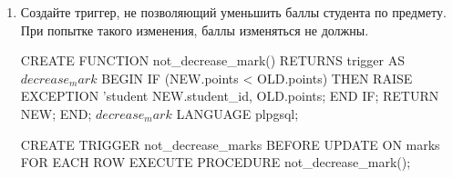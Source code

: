 \documentclass[10pt, a4paper]{article}
\begin{document}
\begin{enumerate}
	\item {Создайте триггер, не позволяющий уменьшить баллы студента по предмету. При попытке такого изменения, баллы изменяться не должны.

	\begin{sql}
CREATE FUNCTION not_decrease_mark() RETURNS trigger AS $decrease_mark$ 
BEGIN 
	IF (NEW.points < OLD.points) THEN	
		RAISE EXCEPTION 'student %
		NEW.student_id, OLD.points;
	END IF;
	RETURN NEW;
END; 
$decrease_mark$ LANGUAGE plpgsql;

CREATE TRIGGER not_decrease_marks BEFORE UPDATE ON marks
	FOR EACH ROW EXECUTE PROCEDURE not_decrease_mark();
	\end{sql}
	}

\end{enumerate}
\end{document}
